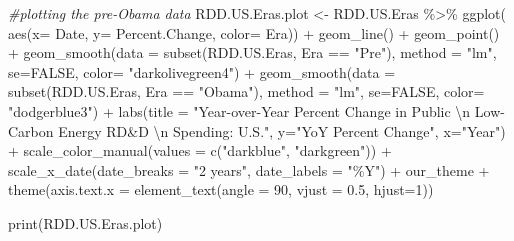 \documentclass[
  12pt,
]{article}
\newenvironment{Shaded}{\begin{snugshade}}{\end{snugshade}}
\newcommand{\AttributeTok}[1]{\textcolor[rgb]{0.77,0.63,0.00}{#1}}
\newcommand{\CommentTok}[1]{\textcolor[rgb]{0.56,0.35,0.01}{\textit{#1}}}
\newcommand{\ConstantTok}[1]{\textcolor[rgb]{0.00,0.00,0.00}{#1}}
\newcommand{\DecValTok}[1]{\textcolor[rgb]{0.00,0.00,0.81}{#1}}
\newcommand{\FloatTok}[1]{\textcolor[rgb]{0.00,0.00,0.81}{#1}}
\newcommand{\FunctionTok}[1]{\textcolor[rgb]{0.00,0.00,0.00}{#1}}
\newcommand{\NormalTok}[1]{#1}
\newcommand{\OtherTok}[1]{\textcolor[rgb]{0.56,0.35,0.01}{#1}}
\newcommand{\SpecialCharTok}[1]{\textcolor[rgb]{0.00,0.00,0.00}{#1}}
\newcommand{\StringTok}[1]{\textcolor[rgb]{0.31,0.60,0.02}{#1}}
\begin{document}
\begin{Shaded}
\begin{Highlighting}[]
\CommentTok{\#plotting the pre{-}Obama data}
\NormalTok{RDD.US.Eras.plot }\OtherTok{\textless{}{-}}\NormalTok{ RDD.US.Eras }\SpecialCharTok{\%\textgreater{}\%}
  \FunctionTok{ggplot}\NormalTok{(}
         \FunctionTok{aes}\NormalTok{(}\AttributeTok{x=}\NormalTok{ Date,}
             \AttributeTok{y=}\NormalTok{ Percent.Change,}
             \AttributeTok{color=}\NormalTok{ Era)) }\SpecialCharTok{+} 
  \FunctionTok{geom\_line}\NormalTok{() }\SpecialCharTok{+}
  \FunctionTok{geom\_point}\NormalTok{() }\SpecialCharTok{+}
  \FunctionTok{geom\_smooth}\NormalTok{(}\AttributeTok{data =} \FunctionTok{subset}\NormalTok{(RDD.US.Eras, Era }\SpecialCharTok{==} \StringTok{"Pre"}\NormalTok{), }\AttributeTok{method =} \StringTok{"lm"}\NormalTok{, }\AttributeTok{se=}\ConstantTok{FALSE}\NormalTok{, }\AttributeTok{color=} \StringTok{"darkolivegreen4"}\NormalTok{) }\SpecialCharTok{+}
  \FunctionTok{geom\_smooth}\NormalTok{(}\AttributeTok{data =} \FunctionTok{subset}\NormalTok{(RDD.US.Eras, Era }\SpecialCharTok{==} \StringTok{"Obama"}\NormalTok{), }\AttributeTok{method =} \StringTok{"lm"}\NormalTok{, }\AttributeTok{se=}\ConstantTok{FALSE}\NormalTok{, }\AttributeTok{color=} \StringTok{"dodgerblue3"}\NormalTok{) }\SpecialCharTok{+}
  \FunctionTok{labs}\NormalTok{(}\AttributeTok{title =} \StringTok{"Year{-}over{-}Year Percent Change in Public }\SpecialCharTok{\textbackslash{}n}\StringTok{ Low{-}Carbon Energy RD\&D }\SpecialCharTok{\textbackslash{}n}\StringTok{ Spending: U.S."}\NormalTok{,}
       \AttributeTok{y=}\StringTok{"YoY Percent Change"}\NormalTok{,}
       \AttributeTok{x=}\StringTok{"Year"}\NormalTok{) }\SpecialCharTok{+} 
  \FunctionTok{scale\_color\_manual}\NormalTok{(}\AttributeTok{values =} \FunctionTok{c}\NormalTok{(}\StringTok{"darkblue"}\NormalTok{, }\StringTok{"darkgreen"}\NormalTok{)) }\SpecialCharTok{+}
  \FunctionTok{scale\_x\_date}\NormalTok{(}\AttributeTok{date\_breaks =} \StringTok{"2 years"}\NormalTok{, }\AttributeTok{date\_labels =} \StringTok{"\%Y"}\NormalTok{) }\SpecialCharTok{+}
\NormalTok{  our\_theme }\SpecialCharTok{+}
  \FunctionTok{theme}\NormalTok{(}\AttributeTok{axis.text.x =} \FunctionTok{element\_text}\NormalTok{(}\AttributeTok{angle =} \DecValTok{90}\NormalTok{, }\AttributeTok{vjust =} \FloatTok{0.5}\NormalTok{, }\AttributeTok{hjust=}\DecValTok{1}\NormalTok{))}
  
\FunctionTok{print}\NormalTok{(RDD.US.Eras.plot)}
\end{Highlighting}
\end{Shaded}
\end{document}

